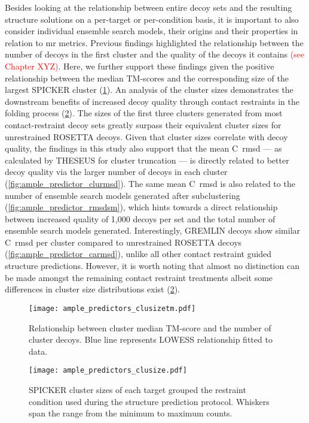 Besides looking at the relationship between entire decoy sets and the resulting structure solutions on a per-target or per-condition basis, it is important to also consider individual ensemble search models, their origins and their properties in relation to \gls{mr} metrics. Previous findings highlighted the relationship between the number of decoys in the first cluster and the quality of the decoys it contains \textcolor{red}{(see Chapter XYZ)}. Here, we further support these findings given the positive relationship between the median TM-scores and the corresponding size of the largest SPICKER cluster (\cref{fig:ample_predictor_clusizetm}). An analysis of the cluster sizes demonstrates the downstream benefits of increased decoy quality through contact restraints in the folding process (\cref{fig:ample_predictor_clusize}). The sizes of the first three clusters generated from most contact-restraint decoy sets greatly surpass their equivalent cluster sizes for unrestrained ROSETTA decoys. Given that cluster sizes correlate with decoy quality, the findings in this study also support that the mean C\textalpha\ \gls{rmsd} --- as calculated by THESEUS for cluster truncation --- is directly related to better decoy quality via the larger number of decoys in each cluster (\cref{fig:ample_predictor_clurmsd}). The same mean C\textalpha\ \gls{rmsd} is also related to the number of ensemble search models generated after subclustering (\cref{fig:ample_predictor_rmsdsm}), which hints towards a direct relationship between increased quality of 1,000 decoys per set and the total number of ensemble search models generated. Interestingly, GREMLIN decoys show similar C\textalpha\ \gls{rmsd} per cluster compared to unrestrained ROSETTA decoys (\cref{fig:ample_predictor_carmsd}), unlike all other contact restraint guided structure predictions. However, it is worth noting that almost no distinction can be made amongst the remaining contact restraint treatments albeit some differences in cluster size distributions exist (\cref{fig:ample_predictor_clusize}).

\begin{figure}[H]
    \centering
    \texttt{[image: ample\_predictors\_clusizetm.pdf]}
    \caption{Relationship between cluster median TM-score and the number of cluster decoys. Blue line represents LOWESS relationship fitted to data.}
    \label{fig:ample_predictor_clusizetm}
\end{figure}

\begin{figure}[H]
    \centering
    \texttt{[image: ample\_predictors\_clusize.pdf]}
    \caption{SPICKER cluster sizes of each target grouped the restraint condition used during the structure prediction protocol. Whiskers span the range from the minimum to maximum counts.}
    \label{fig:ample_predictor_clusize}
\end{figure}

